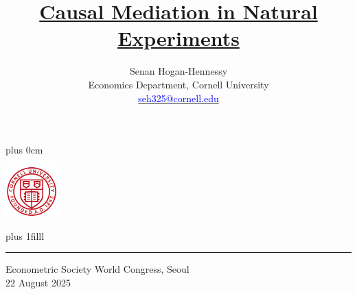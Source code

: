 \documentclass[dvipsnames]{beamer} %
\title{\color{titleText}
    \href{https://raw.githubusercontent.com/shoganhennessy/mediation-natural-experiment/main/mediation-natural-experiment-2025.pdf}{Causal Mediation in Natural Experiments}
}
\author[Senan Hogan-Hennessy, Cornell University]{
    Senan Hogan-Hennessy \\
    Economics Department, Cornell University \\ %
    \href{mailto:seh325@cornell.edu}{\textcolor{blue}{seh325@cornell.edu}}
}
\date{} %
\renewcommand{\raggedright}{\leftskip=0pt \rightskip=0pt plus 0cm}
\begin{document}
\raggedright
\begin{frame}
    \vspace{1.5cm}
    \titlepage
    \begin{center}
        \vspace{-1.5cm}
        \includegraphics[width=2cm]{presentation-files/cornell}

        \vskip0pt plus 1filll
        \par\noindent\rule{\textwidth}{0.4pt}
        Econometric Society World Congress, Seoul \\
        22 August 2025
    \end{center}
\end{frame}
\end{document}
